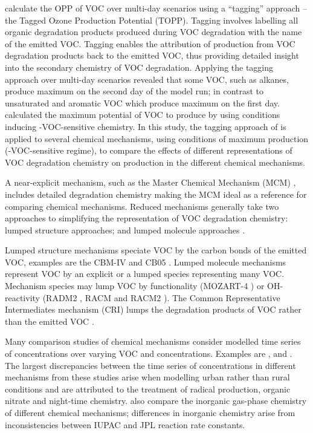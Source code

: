 \citet{Butler:2011} calculate the OPP of VOC over multi-day scenarios using a ``tagging'' approach -- the Tagged Ozone Production Potential (TOPP). 
Tagging involves labelling all organic degradation products produced during VOC degradation with the name of the emitted VOC.
Tagging enables the attribution of  production from VOC degradation products back to the emitted VOC, thus providing detailed insight into the secondary chemistry of VOC degradation.
Applying the tagging approach over multi-day scenarios revealed that some VOC, such as alkanes, produce maximum  on the second day of the model run; in contrast to unsaturated and aromatic VOC which produce maximum  on the first day.
\citet{Butler:2011} calculated the maximum potential of VOC to produce  by using  conditions inducing -VOC-sensitive chemistry.
In this study, the tagging approach of \citet{Butler:2011} is applied to several chemical mechanisms, using conditions of maximum  production (-VOC-sensitive regime), to compare the effects of different representations of VOC degradation chemistry on  production in the different chemical mechanisms.

A near-explicit mechanism, such as the Master Chemical Mechanism (MCM) \citep{Jenkin:2003, Saunders:2003, Bloss:2005}, includes detailed degradation chemistry making the MCM ideal as a reference for comparing chemical mechanisms.
Reduced mechanisms generally take two approaches to simplifying the representation of VOC degradation chemistry: lumped structure approaches; and lumped molecule approaches \citep{Dodge:2000}. 

Lumped structure mechanisms speciate VOC by the carbon bonds of the emitted VOC, examples are the CBM-IV \citep{Gery:1989} and CB05 \citep{Yarwood:2005}.
Lumped molecule mechanisms represent VOC by an explicit or a lumped species representing many VOC. 
Mechanism species may lump VOC by functionality (MOZART-4 \citep{Emmons:2010}) or OH-reactivity (RADM2 \citep{Stockwell:1990}, RACM \citep{Stockwell:1997} and RACM2 \citep{Goliff:2013}).
The Common Representative Intermediates mechanism (CRI) lumps the degradation products of VOC rather than the emitted VOC \citep{Jenkin:2008}.

Many comparison studies of chemical mechanisms consider modelled time series of  concentrations over varying VOC and  concentrations.
Examples are \citet{Dunker:1984}, \citet{Kuhn:1998} and \citet{Emmerson:2009}.
The largest discrepancies between the time series of  concentrations in different mechanisms from these studies arise when modelling urban rather than rural conditions and are attributed to the treatment of radical production, organic nitrate and night-time chemistry.
\citet{Emmerson:2009} also compare the inorganic gas-phase chemistry of different chemical mechanisms; differences in inorganic chemistry arise from inconsistencies between IUPAC and JPL reaction rate constants.

